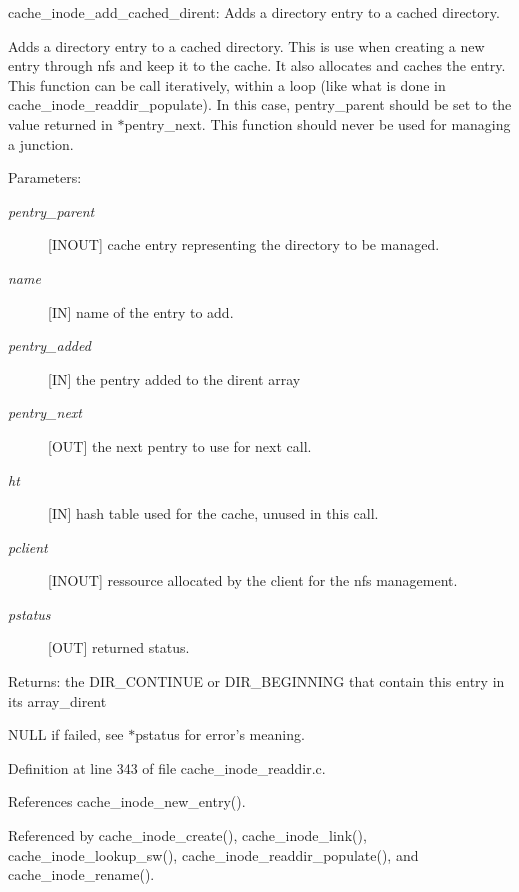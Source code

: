 cache\_\-inode\_\-add\_\-cached\_\-dirent: Adds a directory entry to a cached directory.

Adds a directory entry to a cached directory. This is use when creating a new entry through nfs and keep it to the cache. It also allocates and caches the entry. This function can be call iteratively, within a loop (like what is done in cache\_\-inode\_\-readdir\_\-populate). In this case, pentry\_\-parent should be set to the value returned in $\ast$pentry\_\-next. This function should never be used for managing a junction.

\begin{Desc}
\item[Parameters:]
\begin{description}
\item[{\em pentry\_\-parent}][INOUT] cache entry representing the directory to be managed. \item[{\em name}][IN] name of the entry to add. \item[{\em pentry\_\-added}][IN] the pentry added to the dirent array \item[{\em pentry\_\-next}][OUT] the next pentry to use for next call. \item[{\em ht}][IN] hash table used for the cache, unused in this call. \item[{\em pclient}][INOUT] ressource allocated by the client for the nfs management. \item[{\em pstatus}][OUT] returned status.\end{description}
\end{Desc}
\begin{Desc}
\item[Returns:]the DIR\_\-CONTINUE or DIR\_\-BEGINNING that contain this entry in its array\_\-dirent\par
 

NULL if failed, see $\ast$pstatus for error's meaning. \end{Desc}


Definition at line 343 of file cache\_\-inode\_\-readdir.c.

References cache\_\-inode\_\-new\_\-entry().

Referenced by cache\_\-inode\_\-create(), cache\_\-inode\_\-link(), cache\_\-inode\_\-lookup\_\-sw(), cache\_\-inode\_\-readdir\_\-populate(), and cache\_\-inode\_\-rename().
